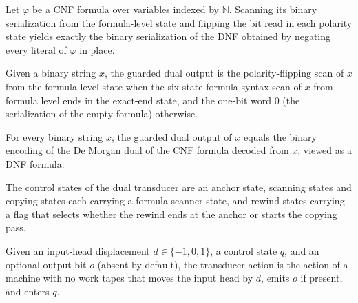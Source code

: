 \begin{lemma}
\label{Complexity.tautDual_serialize}
\leanok
{}
Let $\varphi$ be a CNF formula over variables indexed by $\mathbb{N}$. Scanning its
binary serialization from the formula-level state and flipping the bit read in each
polarity state yields exactly the binary serialization of the DNF obtained by negating
every literal of $\varphi$ in place.
\end{lemma}

\begin{definition}
\label{Complexity.tautDualOutput}
\leanok
{}
Given a binary string $x$, the guarded dual output is the polarity-flipping scan of $x$
from the formula-level state when the six-state formula syntax scan of $x$ from
formula level ends in the exact-end state, and the one-bit word $0$ (the serialization
of the empty formula) otherwise.
\end{definition}

\begin{lemma}
\label{Complexity.tautDual_output}
\leanok
{}
For every binary string $x$, the guarded dual output of $x$ equals the binary encoding
of the De Morgan dual of the CNF formula decoded from $x$, viewed as a DNF formula.
\end{lemma}

\begin{definition}
\label{Complexity.TautDualControl}
\leanok
{}
The control states of the dual transducer are an anchor state, scanning states and
copying states each carrying a formula-scanner state, and rewind states carrying a
flag that selects whether the rewind ends at the anchor or starts the copying pass.
\end{definition}

\begin{definition}
\label{Complexity.tautDualAction}
\leanok
{}
Given an input-head displacement $d \in \{-1, 0, 1\}$, a control state $q$, and an
optional output bit $o$ (absent by default), the transducer action is the action of a
machine with no work tapes that moves the input head by $d$, emits $o$ if present, and
enters $q$.
\end{definition}

